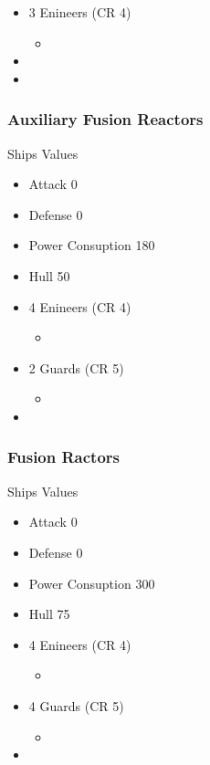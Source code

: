 \documentclass[11pt]{article}
\begin{document}
{\begin{itemize}
\item 3 Enineers (CR 4)
\begin{itemize}
\item {}
\end{itemize}
\item {}
\item {}
\end{itemize}
\subsubsection{Auxiliary Fusion Reactors}
\label{sec:orgfc1317e}
Ships Values
\begin{itemize}
\item Attack 0
\item Defense 0
\item Power Consuption 180
\item Hull 50

\item 4 Enineers (CR 4)
\begin{itemize}
\item {}
\end{itemize}
\item 2 Guards (CR 5)
\begin{itemize}
\item {}
\end{itemize}
\item {}
\end{itemize}
\subsubsection{Fusion Ractors}
\label{sec:org0bac500}
Ships Values
\begin{itemize}
\item Attack 0
\item Defense 0
\item Power Consuption 300
\item Hull 75

\item 4 Enineers (CR 4)
\begin{itemize}
\item {}
\end{itemize}
\item 4 Guards (CR 5)
\begin{itemize}
\item {}
\end{itemize}
\item {}
\end{itemize}
}
\end{document}

